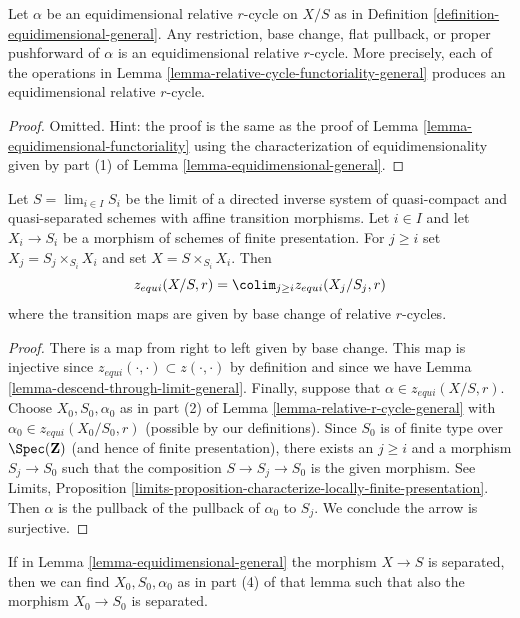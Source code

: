 \begin{lemma}
\label{lemma-equidimensional-functoriality-general}
Let $\alpha$ be an equidimensional relative $r$-cycle on $X/S$ as in
Definition \ref{definition-equidimensional-general}.
Any restriction, base change, flat pullback, or proper pushforward
of $\alpha$ is an equidimensional relative $r$-cycle.
More precisely, each of the operations in
Lemma \ref{lemma-relative-cycle-functoriality-general}
produces an equidimensional relative $r$-cycle.
\end{lemma}

\begin{proof}
Omitted. Hint: the proof is the same as the proof of
Lemma \ref{lemma-equidimensional-functoriality}
using the characterization of equidimensionality
given by part (1) of 
Lemma \ref{lemma-equidimensional-general}.
\end{proof}

\begin{lemma}
\label{lemma-equi-descend-through-limit-general}
Let $S = \lim_{i \in I} S_i$ be the limit of a directed inverse system of
quasi-compact and quasi-separated schemes with affine transition morphisms.
Let $i \in I$ and let $X_i \to S_i$ be a morphism of schemes of finite
presentation. For $j \geq i$ set $X_j = S_j \times_{S_i} X_i$ and set
$X = S \times_{S_i} X_i$. Then
$$
z_{equi}(X/S, r) = \colim_{j \geq i} z_{equi}(X_j/S_j, r)
$$
where the transition maps are given by base change of relative $r$-cycles.
\end{lemma}

\begin{proof}
There is a map from right to left given by base change.
This map is injective since $z_{equi}(\cdot, \cdot) \subset z(\cdot, \cdot)$
by definition and since we have
Lemma \ref{lemma-descend-through-limit-general}.
Finally, suppose that $\alpha \in z_{equi}(X/S, r)$.
Choose $X_0, S_0, \alpha_0$
as in part (2) of Lemma \ref{lemma-relative-r-cycle-general}
with $\alpha_0 \in z_{equi}(X_0/S_0, r)$ (possible by our
definitions). Since $S_0$ is of finite
type over $\Spec(\mathbf{Z})$ (and hence of finite presentation),
there exists an $j \geq i$ and a morphism $S_j \to S_0$ such
that the composition $S \to S_j \to S_0$ is the given morphism.
See Limits, Proposition
\ref{limits-proposition-characterize-locally-finite-presentation}.
Then $\alpha$ is the pullback of the pullback of $\alpha_0$
to $S_j$. We conclude the arrow is surjective.
\end{proof}

\begin{lemma}
\label{lemma-equidimensional-general-bis}
If in Lemma \ref{lemma-equidimensional-general} the morphism $X \to S$ is
separated, then we can find $X_0, S_0, \alpha_0$ as in part (4) of that
lemma such that also the morphism $X_0 \to S_0$ is separated.
\end{lemma}

